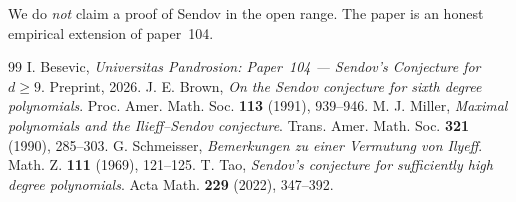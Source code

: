 \documentclass[11pt,a4paper]{article}
\begin{document}
We do \emph{not} claim a proof of Sendov in the open range. The paper is an honest empirical extension of paper~104.

\begin{thebibliography}{99}
 I. Besevic, \textit{Universitas Pandrosion: Paper~104 --- Sendov's Conjecture for $d \ge 9$}. Preprint, 2026.
 J. E. Brown, \textit{On the Sendov conjecture for sixth degree polynomials}. Proc. Amer. Math. Soc. \textbf{113} (1991), 939--946.
 M. J. Miller, \textit{Maximal polynomials and the Ilieff--Sendov conjecture}. Trans. Amer. Math. Soc. \textbf{321} (1990), 285--303.
 G. Schmeisser, \textit{Bemerkungen zu einer Vermutung von Ilyeff}. Math. Z. \textbf{111} (1969), 121--125.
 T. Tao, \textit{Sendov's conjecture for sufficiently high degree polynomials}. Acta Math. \textbf{229} (2022), 347--392.
\end{thebibliography}
\end{document}
